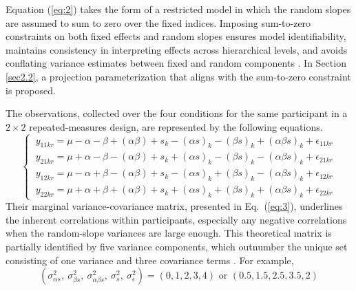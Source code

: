 \documentclass[preprint,12pt,authoryear]{elsarticle}
\begin{document}
Equation (\ref{eq:2}) takes the form of a restricted model in which the random slopes are assumed to sum to zero over the fixed indices. Imposing sum-to-zero constraints on both fixed effects and random slopes ensures model identifiability, maintains consistency in interpreting effects across hierarchical levels, and avoids conflating variance estimates between fixed and random components \citetext{%
	\citealp[p.~153]{burdick_confidence_1992}; %
	\citealp{cornfield_average_1956}; %
	\citealp[p.~143]{meier_anova_2022}; %
	\citealp[p.~165]{myers_fundamentals_1979}; %
	\citealp[p.~403]{searle_linear_1997}; %
	but see \citealp{bates_fitting_2015}}.
In Section \ref{sec2.2}, a projection parameterization that aligns with the sum-to-zero constraint is proposed.
	
The observations, collected over the four conditions for the same participant in a $2\times2$ repeated-measures design, are represented by the following equations.
\begin{equation*}
	\begin{cases}
		\ y_{11kr}=\mu-\alpha-\beta+(\alpha\beta)+s_k-(\alpha s)_k-(\beta s)_k+(\alpha\beta s)_k+\epsilon_{11kr} \\
		\ y_{21kr}=\mu+\alpha-\beta-(\alpha\beta)+s_k+(\alpha s)_k-(\beta s)_k-(\alpha\beta s)_k+\epsilon_{21kr} \\
		\ y_{12kr}=\mu-\alpha+\beta-(\alpha\beta)+s_k-(\alpha s)_k+(\beta s)_k-(\alpha\beta s)_k+\epsilon_{12kr} \\
		\ y_{22kr}=\mu+\alpha+\beta+(\alpha\beta)+s_k+(\alpha s)_k+(\beta s)_k+(\alpha\beta s)_k+\epsilon_{22kr}
	\end{cases}
\end{equation*}
Their marginal variance-covariance matrix, presented in Eq.~(\ref{eq:3}), underlines the inherent correlations within participants, especially any negative correlations when the random-slope variances are large enough. This theoretical matrix is partially identified by five variance components, which outnumber the unique set consisting of one variance and three covariance terms \citep{gustafson_bayesian_2015}. For example,
\begin{equation*}
	(\sigma_{\alpha s}^2,\ \!\sigma_{\beta s}^2,\ \!\sigma_{\alpha\beta s}^2,\ \!\sigma_s^2,\ \!\sigma_\epsilon^2)=(0,1,2,3,4)\text{ or }(0.5, 1.5, 2.5, 3.5, 2)
\end{equation*}
\end{document}

